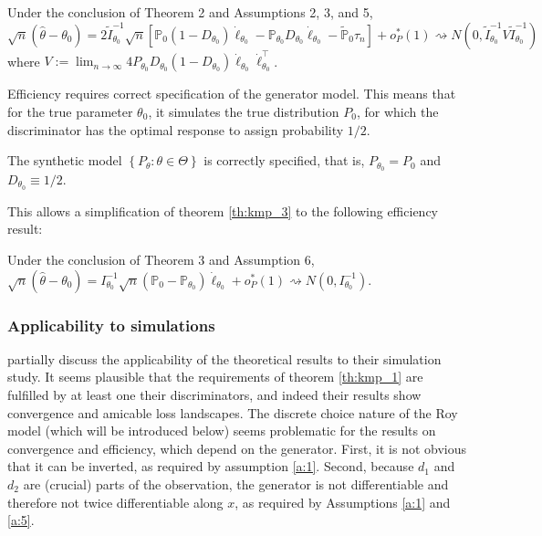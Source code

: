 \begin{theorem}
    \label{th:kmp_3}
    Under the conclusion of Theorem 2 and Assumptions 2, 3, and 5,
    \begin{equation}
        \sqrt{n}\left(\hat{\theta}-\theta_{0}\right)=2 \tilde{I}_{\theta_{0}}^{-1} \sqrt{n}\left[\mathbb{P}_{0}\left(1-D_{\theta_{0}}\right) \dot{\ell}_{\theta_{0}}-\mathbb{P}_{\theta_{0}} D_{\theta_{0}} \dot{\ell}_{\theta_{0}}-\tilde{\mathbb{P}}_{0} \tau_{n}\right]+o_{P}^{*}(1) \rightsquigarrow N\left(0, \tilde{I}_{\theta_{0}}^{-1} V \tilde{I}_{\theta_{0}}^{-1}\right)
    \end{equation}
    where $V:=\lim _{n \rightarrow \infty} 4 P_{\theta_{0}} D_{\theta_{0}}\left(1-D_{\theta_{0}}\right) \dot{\ell}_{\theta_{0}} \dot{\ell}_{\theta_{0}}^{\top}$.\\
\end{theorem}

Efficiency requires correct specification of the generator model.
This means that for the true parameter $\theta_0$, it simulates the true distribution $P_0$, for which the discriminator has the optimal response to assign probability $1/2$. %

\begin{assumption}[A6, KMP]
    The synthetic model $\left\{P_{\theta}: \theta \in \Theta\right\}$ is correctly specified, that is, $P_{\theta_{0}}=P_{0}$ and $D_{\theta_{0}} \equiv 1 / 2$.
\end{assumption}

This allows a simplification of theorem \ref{th:kmp_3} to the following efficiency result:

\begin{theorem}
    Under the conclusion of Theorem 3 and Assumption 6, $\sqrt{n}\left(\hat{\theta}-\theta_{0}\right)=I_{\theta_{0}}^{-1} \sqrt{n}\left(\mathbb{P}_{0}-\mathbb{P}_{\theta_{0}}\right) \dot{\ell}_{\theta_{0}}+o_{P}^{*}(1) \rightsquigarrow N\left(0, I_{\theta_{0}}^{-1}\right)$.
\end{theorem}

\subsubsection{Applicability to simulations}
\label{sec:theoerem_simulation}

\textcite{kaji2023adversarial} partially discuss the applicability of the theoretical results to their simulation study.
It seems plausible that the requirements of theorem \ref{th:kmp_1} are fulfilled by at least one their discriminators, and indeed their results show convergence and amicable loss landscapes.
The discrete choice nature of the Roy model (which will be introduced below) seems problematic for the results on convergence and efficiency, which depend on the generator. %
First, it is not obvious that it can be inverted, as required by assumption \ref{a:1}.
Second, because $d_1$ and $d_2$ are (crucial) parts of the observation, the generator is not differentiable and therefore not twice differentiable along $x$, as required by Assumptions \ref{a:1} and \ref{a:5}.

